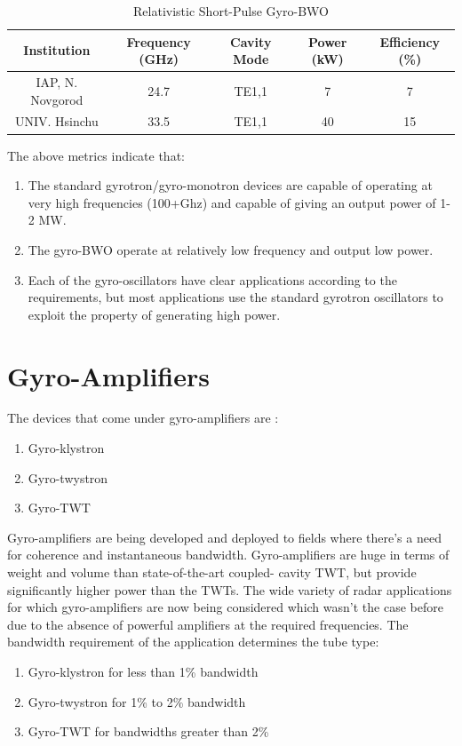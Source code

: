 \begin{table}[H]
	\begin{tabular}{c|c|c|c|c}	
	Institution & Frequency (GHz) & Cavity Mode & Power (kW) & Efficiency (\%) \\
	\hline
	IAP, N. Novgorod & 24.7 & TE1,1 & 7 & 7\\
	UNIV. Hsinchu & 33.5 & TE1,1 & 40 & 15
	\end{tabular}
	\caption{Relativistic Short-Pulse Gyro-BWO\cite{ref:soa} }
	\label{tab:spgb}
\end{table}

The above metrics\cite{ref:soa} indicate that:
\begin{enumerate}
\item The standard gyrotron/gyro-monotron devices are capable of operating at very high frequencies (100+Ghz) and capable of giving an output power of 1-2 MW.
\item The gyro-BWO operate at relatively low frequency and output low power.
\item

Each of the gyro-oscillators have clear applications according to the requirements, but most applications use the standard gyrotron oscillators to exploit the property of generating high power.
\end{enumerate}


\section{Gyro-Amplifiers}
The devices that come under gyro-amplifiers are :
\begin{enumerate}
\item  Gyro-klystron
\item  Gyro-twystron
\item Gyro-TWT
\end{enumerate}

Gyro-amplifiers are being developed and deployed to fields where there's a need for coherence and instantaneous bandwidth. Gyro-amplifiers are huge in terms of weight and volume than state-of-the-art coupled- cavity TWT, but provide significantly higher power than the TWTs. The wide variety of radar applications for which gyro-amplifiers are now being considered which wasn't the case before due to the absence of powerful amplifiers at the required frequencies. The bandwidth requirement of the application determines the tube type:

\begin{enumerate}
\item Gyro-klystron for less than 1\% bandwidth
\item Gyro-twystron for 1\% to 2\% bandwidth
\item Gyro-TWT for bandwidths greater than 2\%
\end{enumerate}

